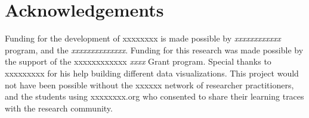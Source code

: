 \documentclass[runningheads]{llncs}
\begin{document}
\section{Acknowledgements}
Funding for the development of xxxxxxxx is made possible by 
\textit{xxxxxxxxxxxx} program, and the \textit{xxxxxxxxxxxxxx}. Funding for 
this research was made possible by the support of the xxxxxxxxxxxx 
\textit{xxxx} Grant program. Special thanks to xxxxxxxxx for his help building 
different data visualizations. This project would not have been possible 
without the xxxxxx network of researcher practitioners, and the students using 
xxxxxxxx.org who consented to share their learning traces with the research 
community.

 
 
\end{document}
